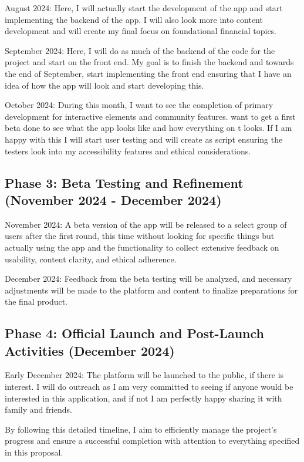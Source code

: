 \documentclass[12pt,twocolumn]{article}
\begin{document}
August 2024: Here, I will actually start the development of the app and start implementing the backend of the app. I will also look more into content development and will create my final focus on foundational financial topics. 

September 2024: Here, I will do as much of the backend of the code for the project and start on the front end. My goal is to finish the backend and towards the end of September, start implementing the front end ensuring that I have an idea of how the app will look and start developing this. 

October 2024: During this month, I want to see the completion of primary development for interactive elements and community features.  want to get a first beta done to see what the app looks like and how everything on t looks. If I am happy with this I will start user testing and will create as script ensuring the testers look into my accessibility features and ethical considerations. 

\subsection{Phase 3: Beta Testing and Refinement (November 2024 - December 2024)}

November 2024: A beta version of the app will be released to a select group of users after the first round, this time without looking for specific things but actually using the app and the functionality to collect extensive feedback on usability, content clarity, and ethical adherence.

December 2024: Feedback from the beta testing will be analyzed, and necessary adjustments will be made to the platform and content to finalize preparations for the final product.

\subsection{Phase 4: Official Launch and Post-Launch Activities (December 2024)}

Early December 2024: The platform will be launched to the public, if there is interest. I will do outreach as I am very committed to seeing if anyone would be interested in this application, and if not I am perfectly happy sharing it with family and friends. 

By following this detailed timeline, I aim to efficiently manage the project's progress and ensure a successful completion with attention to everything specified in this proposal.
\end{document}
